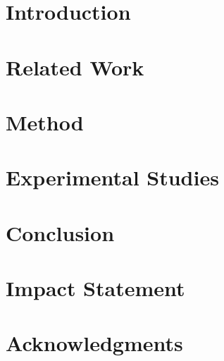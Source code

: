\documentclass{article}
\numberwithin{equation}{section}
\begin{document}
\twocolumn[
  \icmltitle{}


  \vskip 0.3in
]

\printAffiliationsAndNotice{}  %

\begin{abstract}
  
\end{abstract}

\section{Introduction}
\label{sec:intro}


\section{Related Work}
\label{sec:related}


\section{Method}
\label{sec:method}


\section{Experimental Studies}
\label{sec:exp}


\section{Conclusion}
\label{sec:conclusion}


\section*{Impact Statement}


\section*{Acknowledgments}





\appendix

\end{document}
